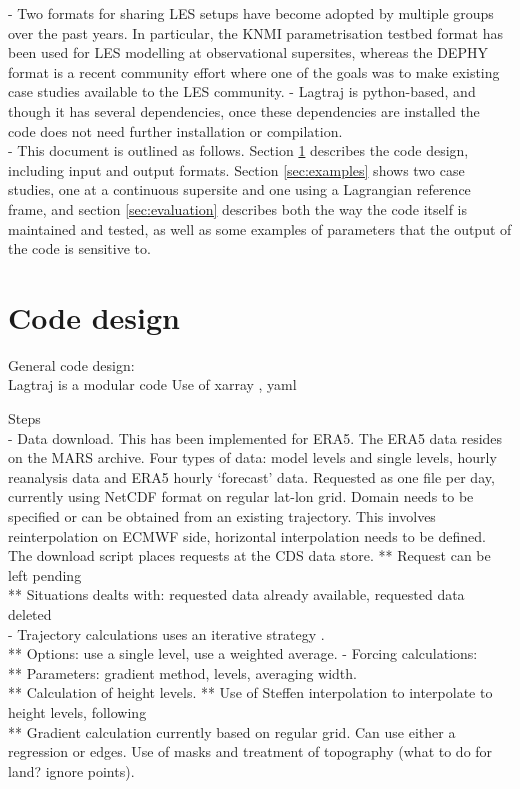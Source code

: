 \documentclass[a4paper,11pt]{article}
\begin{document}
- Two formats for sharing LES setups have become adopted by multiple
groups over the past years. In particular, the KNMI parametrisation
testbed format has been used for LES modelling at observational
supersites, whereas the DEPHY format is a recent community effort where
one of the goals was to make existing case studies available to the LES
community.
- Lagtraj is python-based, and though it has several dependencies, once
these dependencies are installed the code does not need further
installation or compilation. \\
- This document is outlined as follows. Section \ref{sec:design}
describes the code design, including input and output formats. Section
\ref{sec:examples} shows two case studies, one at a continuous supersite
and one using a Lagrangian reference frame, and section
\ref{sec:evaluation} describes both the way the code itself is
maintained and tested, as well as some examples of parameters that the
output of the code is sensitive to. \\

\section{Code design}\label{sec:design}

General code design: \\
Lagtraj is a modular code
Use of xarray \citep{hoyer2017}, yaml \citep{ben2009}

Steps \\
- Data download. This has been implemented for ERA5. The ERA5 data
resides on the MARS archive. Four types of data: model levels and
single levels, hourly reanalysis data and ERA5 hourly `forecast' data.
Requested as one file per day, currently using NetCDF format on regular
lat-lon grid. Domain needs to be specified or can be obtained from an
existing trajectory. This involves reinterpolation on ECMWF side,
horizontal interpolation needs to be defined. The download script
places requests at the CDS data store.
** Request can be left pending \\
** Situations dealts with: requested data already available, requested data deleted \\
- Trajectory calculations uses an iterative strategy \citep{petterssen1956,sprenger2015}. \\
** Options: use a single level, use a weighted average.
- Forcing calculations: \\
** Parameters: gradient method, levels, averaging width. \\
** Calculation of height levels.
** Use of Steffen interpolation to interpolate to height levels, following \cite{yamaguchi2012} \\
** Gradient calculation currently based on regular grid. Can use either a regression or edges. Use of masks and treatment of topography (what to do for land? ignore points). \\
\end{document}
